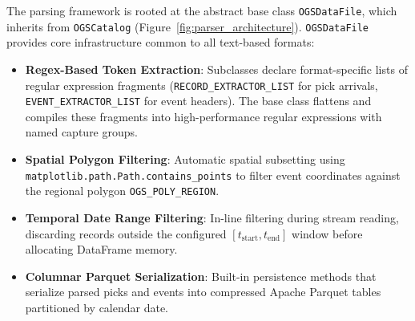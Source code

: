 The parsing framework is rooted at the abstract base class \texttt{OGSDataFile}, which inherits from \texttt{OGSCatalog} (Figure~\ref{fig:parser_architecture}). \texttt{OGSDataFile} provides core infrastructure common to all text-based formats:
\begin{itemize}
  \item \textbf{Regex-Based Token Extraction}: Subclasses declare format-specific lists of regular expression fragments (\texttt{RECORD\_EXTRACTOR\_LIST} for pick arrivals, \texttt{EVENT\_EXTRACTOR\_LIST} for event headers). The base class flattens and compiles these fragments into high-performance regular expressions with named capture groups.
  \item \textbf{Spatial Polygon Filtering}: Automatic spatial subsetting using \texttt{matplotlib.path.Path.contains\_points} to filter event coordinates against the regional polygon \texttt{OGS\_POLY\_REGION}.
  \item \textbf{Temporal Date Range Filtering}: In-line filtering during stream reading, discarding records outside the configured $[t_{\mathrm{start}}, t_{\mathrm{end}}]$ window before allocating DataFrame memory.
  \item \textbf{Columnar Parquet Serialization}: Built-in persistence methods that serialize parsed picks and events into compressed Apache Parquet tables partitioned by calendar date.
\end{itemize}


